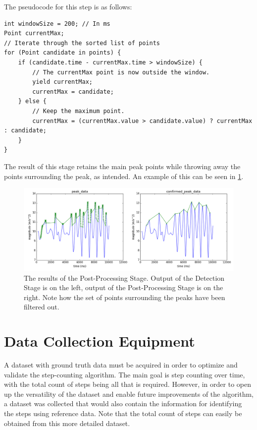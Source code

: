             The pseudocode for this step is as follows:

            \begin{lstlisting}
int windowSize = 200; // In ms
Point currentMax;
// Iterate through the sorted list of points
for (Point candidate in points) {
    if (candidate.time - currentMax.time > windowSize) {
        // The currentMax point is now outside the window. 
        yield currentMax;
        currentMax = candidate;
    } else {
        // Keep the maximum point.
        currentMax = (currentMax.value > candidate.value) ? currentMax : candidate;
    }
}
            \end{lstlisting}

            The result of this stage retains the main peak points while throwing away the points surrounding the peak, as intended. An example of this can be seen in \ref{img_post_stage}.

            \begin{figure}[!th]
                \includegraphics[width=\textwidth]{Images/post_stage.png}
                \centering
                \caption{The results of the Post-Processing Stage. Output of the Detection Stage is on the left, output of the Post-Processing Stage is on the right. Note how the set of points surrounding the peaks have been filtered out.}
                \label{img_post_stage}
            \end{figure}

    \chapter{Data Collection Equipment}
    \label{sc_device}

        A dataset with ground truth data must be acquired in order to optimize and validate the step-counting algorithm. The main goal is step counting over time, with the total count of steps being all that is required. However, in order to open up the versatility of the dataset and enable future improvements of the algorithm, a dataset was collected that would also contain the information for identifying the steps using reference data. Note that the total count of steps can easily be obtained from this more detailed dataset. 


